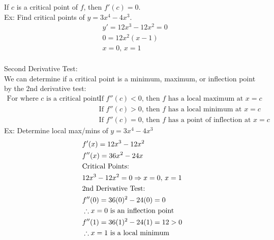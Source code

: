 \documentclass[11pt, fleqn]{article}
\begin{document}
If $c$ is a critical point of $f$, then $f'(c)=0$.\\
Ex: Find critical points of $y=3x^4-4x^3$.
\begin{align*}
    &y'=12x^3-12x^2=0\\
    &0=12x^2(x-1)\\
    &x=0,\,x=1
\end{align*}
\\
Second Derivative Test:\\
We can determine if a critical point is a minimum, maximum, or inflection point by the 2nd derivative test:
\begin{align*}
    \text{For where }c\text{ is a critical point, }
    &\text{If }f''(c)<0\text{, then $f$ has a local maximum at $x=c$}\\
    &\text{If }f''(c)>0\text{, then $f$ has a local minimum at $x=c$}\\
    &\text{If }f''(c)=0\text{, then $f$ has a point of inflection at $x=c$}
\end{align*}
Ex: Determine local max/mins of $y=3x^4-4x^3$
\begin{align*}
    &f'(x)=12x^3-12x^2\\
    &f''(x)=36x^2-24x\\
    &\text{Critical Points: }\\
    &12x^3-12x^2=0\Rightarrow x=0,\,x=1\\
    &\text{2nd Derivative Test:}\\
    &f''(0)=36(0)^2-24(0)=0\\
    &\therefore x=0\text{ is an inflection point}\\
    &f''(1)=36(1)^2-24(1)=12>0\\
    &\therefore x=1\text{ is a local minimum}
\end{align*}
\end{document}

